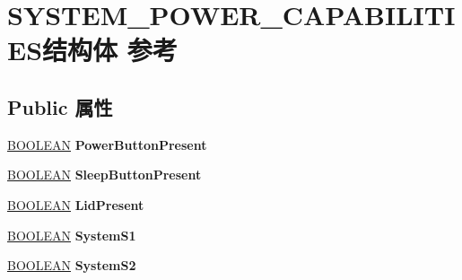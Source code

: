 \hypertarget{struct_s_y_s_t_e_m___p_o_w_e_r___c_a_p_a_b_i_l_i_t_i_e_s}{}\section{S\+Y\+S\+T\+E\+M\+\_\+\+P\+O\+W\+E\+R\+\_\+\+C\+A\+P\+A\+B\+I\+L\+I\+T\+I\+E\+S结构体 参考}
\label{struct_s_y_s_t_e_m___p_o_w_e_r___c_a_p_a_b_i_l_i_t_i_e_s}
\subsection*{Public 属性}
\begin{DoxyCompactItemize}
\item 
\mbox{\label{struct_s_y_s_t_e_m___p_o_w_e_r___c_a_p_a_b_i_l_i_t_i_e_s_a2a541eb120f8b24bd31b1bdfa8d300c4}} 
\hyperlink{_processor_bind_8h_a112e3146cb38b6ee95e64d85842e380a}{B\+O\+O\+L\+E\+AN} {\bfseries Power\+Button\+Present}
\item 
\mbox{\label{struct_s_y_s_t_e_m___p_o_w_e_r___c_a_p_a_b_i_l_i_t_i_e_s_ab3c36d6638c0cd016fa71f88e7462578}} 
\hyperlink{_processor_bind_8h_a112e3146cb38b6ee95e64d85842e380a}{B\+O\+O\+L\+E\+AN} {\bfseries Sleep\+Button\+Present}
\item 
\mbox{\label{struct_s_y_s_t_e_m___p_o_w_e_r___c_a_p_a_b_i_l_i_t_i_e_s_ad6658ea9a37446d08dc3d84dbc622c86}} 
\hyperlink{_processor_bind_8h_a112e3146cb38b6ee95e64d85842e380a}{B\+O\+O\+L\+E\+AN} {\bfseries Lid\+Present}
\item 
\mbox{\label{struct_s_y_s_t_e_m___p_o_w_e_r___c_a_p_a_b_i_l_i_t_i_e_s_ac017916a0bf4e1bc2adc2523de11deca}} 
\hyperlink{_processor_bind_8h_a112e3146cb38b6ee95e64d85842e380a}{B\+O\+O\+L\+E\+AN} {\bfseries System\+S1}
\item 
\mbox{\label{struct_s_y_s_t_e_m___p_o_w_e_r___c_a_p_a_b_i_l_i_t_i_e_s_acc60a2b7ba5718a76a82e826db42fb18}} 
\hyperlink{_processor_bind_8h_a112e3146cb38b6ee95e64d85842e380a}{B\+O\+O\+L\+E\+AN} {\bfseries System\+S2}

\end{DoxyCompactItemize}
